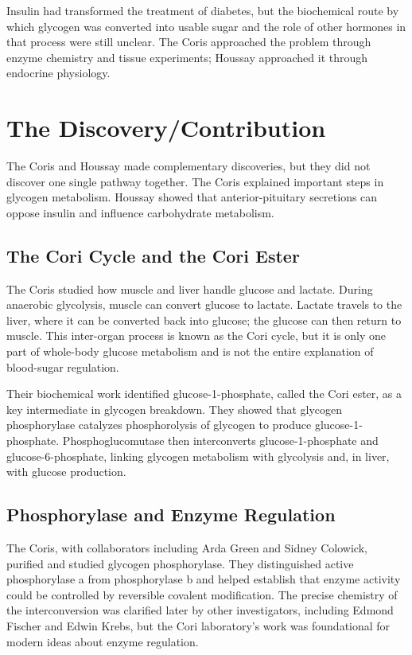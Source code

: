 Insulin had transformed the treatment of diabetes, but the biochemical route by which glycogen was converted into usable sugar and the role of other hormones in that process were still unclear. The Coris approached the problem through enzyme chemistry and tissue experiments; Houssay approached it through endocrine physiology.

\section{The Discovery/Contribution}

The Coris and Houssay made complementary discoveries, but they did not discover one single pathway together. The Coris explained important steps in glycogen metabolism. Houssay showed that anterior-pituitary secretions can oppose insulin and influence carbohydrate metabolism.

\subsection{The Cori Cycle and the Cori Ester}

The Coris studied how muscle and liver handle glucose and lactate. During anaerobic glycolysis, muscle can convert glucose to lactate. Lactate travels to the liver, where it can be converted back into glucose; the glucose can then return to muscle. This inter-organ process is known as the Cori cycle, but it is only one part of whole-body glucose metabolism and is not the entire explanation of blood-sugar regulation.

Their biochemical work identified glucose-1-phosphate, called the Cori ester, as a key intermediate in glycogen breakdown. They showed that glycogen phosphorylase catalyzes phosphorolysis of glycogen to produce glucose-1-phosphate. Phosphoglucomutase then interconverts glucose-1-phosphate and glucose-6-phosphate, linking glycogen metabolism with glycolysis and, in liver, with glucose production.

\subsection{Phosphorylase and Enzyme Regulation}

The Coris, with collaborators including Arda Green and Sidney Colowick, purified and studied glycogen phosphorylase. They distinguished active phosphorylase a from phosphorylase b and helped establish that enzyme activity could be controlled by reversible covalent modification. The precise chemistry of the interconversion was clarified later by other investigators, including Edmond Fischer and Edwin Krebs, but the Cori laboratory's work was foundational for modern ideas about enzyme regulation.

